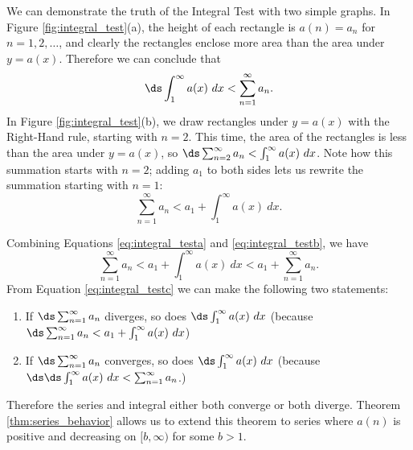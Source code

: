 We can demonstrate the truth of the Integral Test with two simple graphs. In Figure \ref{fig:integral_test}(a), the height of each rectangle is $a(n)=a_n$ for $n=1,2,\ldots$, and clearly the rectangles enclose more area than the area under $y=a(x)$. Therefore we can conclude that \
\begin{equation}
\ds \int_1^\infty a(x)\ dx < \sum_{n=1}^\infty a_n.
\label{eq:integral_testa}
\end{equation}
In Figure \ref{fig:integral_test}(b), we draw rectangles under $y=a(x)$ with the Right-Hand rule, starting with $n=2$. This time, the area of the rectangles is less than the area under $y=a(x)$, so $\ds\sum_{n=2}^\infty a_n < \int_1^\infty a(x)\ dx$. Note how this summation starts with $n=2$; adding $a_1$ to both sides lets us rewrite the summation starting with $n=1$:
\begin{equation}\sum_{n=1}^\infty a_n < a_1 +\int_1^\infty a(x)\ dx.\label{eq:integral_testb}
\end{equation} 


Combining Equations \eqref{eq:integral_testa} and \eqref{eq:integral_testb}, we have
\begin{equation}\sum_{n=1}^\infty a_n< a_1 +\int_1^\infty a(x)\ dx < a_1 + \sum_{n=1}^\infty a_n.\label{eq:integral_testc}\end{equation}
From Equation \eqref{eq:integral_testc} we can make the following two statements:
\begin{enumerate}
	\item If $\ds \sum_{n=1}^\infty a_n$ diverges, so does $\ds\int_1^\infty a(x)\ dx$ \quad (because $\ds \sum_{n=1}^\infty a_n < a_1 +\int_1^\infty a(x)\ dx$)
	\item	If $\ds \sum_{n=1}^\infty a_n$ converges, so does $\ds\int_1^\infty a(x)\ dx$ \quad (because $\ds \ds \int_1^\infty a(x)\ dx < \sum_{n=1}^\infty a_n$.)
\end{enumerate}
Therefore the series and integral either both converge or both diverge. Theorem \ref{thm:series_behavior} allows us to extend this theorem to series where $a(n)$ is positive and decreasing on $[b,\infty)$ for some $b>1$.\\

